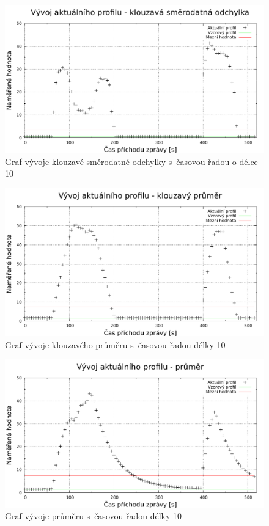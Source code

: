    \begin{figure}[ht]
   \begin{center}
   \includegraphics[scale=0.7]{pictures/moving_standard_deviation_progress}
   \caption{Graf vývoje klouzavé směrodatné odchylky s~časovou řadou o délce 10}
   \label{obr.progressStandardDeviation}
   \end{center}
   \end{figure}
    
  \begin{figure}[ht]
   \begin{center}
   \includegraphics[scale=0.7]{pictures/moving_average_progress}
   \caption{Graf vývoje klouzavého průměru s~časovou řadou délky 10}
   \label{obr.progressAverage}
   \end{center}
   \end{figure}
   
   \begin{figure}[ht]
   \begin{center}
   \includegraphics[scale=0.7]{pictures/average_progress}
   \caption{Graf vývoje průměru s~časovou řadou délky 10}
   \label{obr.progressCumAverage}
   \end{center}
   \end{figure}